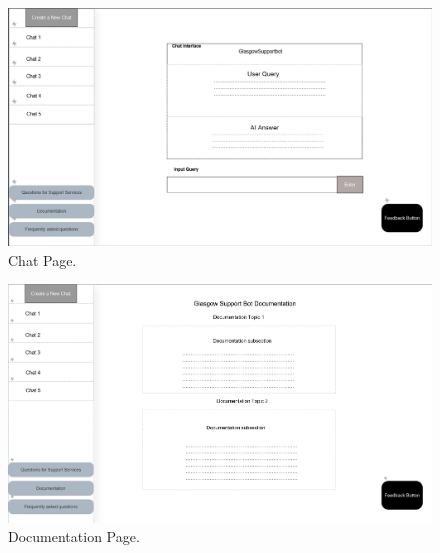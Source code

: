 \documentclass{l4proj}
\begin{document}
\begin{appendices}
\begin{figure}[h!]
  \centering
  \begin{adjustbox}{center,max height=0.4\textheight, max width=\linewidth}
    \includegraphics{images/wireframechatpage.png}
  \end{adjustbox}
  \caption{Chat Page.}
\end{figure}

\begin{figure}[h!]
  \centering
  \begin{adjustbox}{center,max height=0.4\textheight, max width=\linewidth}
    \includegraphics{images/wireframedocpage.png}
  \end{adjustbox}
  \caption{Documentation Page.}
\end{figure}


\end{appendices}
\end{document}
